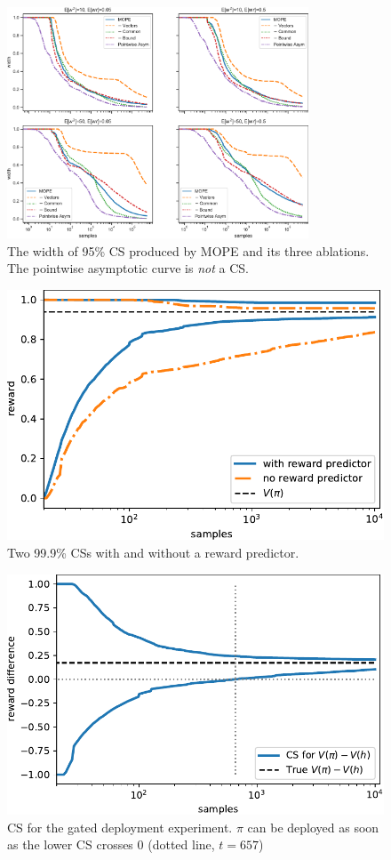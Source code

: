 \begin{figure}
    \centering
    \includegraphics[width=0.8\textwidth]{width}
    \caption{The width of 95\% CS produced by MOPE and its three ablations.
    The pointwise asymptotic curve is \emph{not} a CS.}
    \label{fig:width}
\end{figure}

\begin{figure}
    \centering
    \includegraphics[width=0.75\linewidth]{predictor}
    \caption{Two 99.9\% CSs with and without a reward predictor.}
    \label{fig:predictor}
\end{figure}

\begin{figure}
    \centering
    \includegraphics[width=0.75\linewidth]{gd}
    \caption{CS for the gated deployment experiment. $\pi$ can be 
    deployed as soon as the lower CS crosses 0 (dotted line, $t=657$)}
    \label{fig:gd}
\end{figure}

